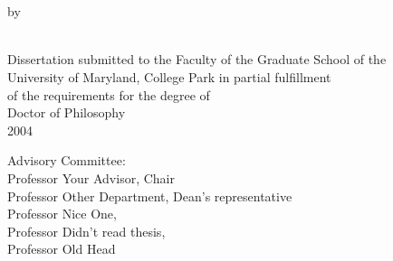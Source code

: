 
\thispagestyle{empty} \hbox{\ } \vspace{1.5in}
\renewcommand{\baselinestretch}{1}
\normalsize
\begin{center}
{ \large
{\MakeUppercase \@title} \\
\vspace{2em}
by\\
\vspace{2em}
\@author \\ %

\vspace{4em}
}

Dissertation submitted to the Faculty of the Graduate School of the \\
University of Maryland, College Park in partial fulfillment \\
of the requirements for the degree of \\
Doctor of Philosophy \\
2004
\end{center}

\vspace{7.5em}

\noindent Advisory Committee: \\
Professor Your Advisor, Chair \\
Professor Other Department, Dean's representative \\
Professor Nice One, \\
Professor Didn't read thesis,\ \\
Professor Old Head
